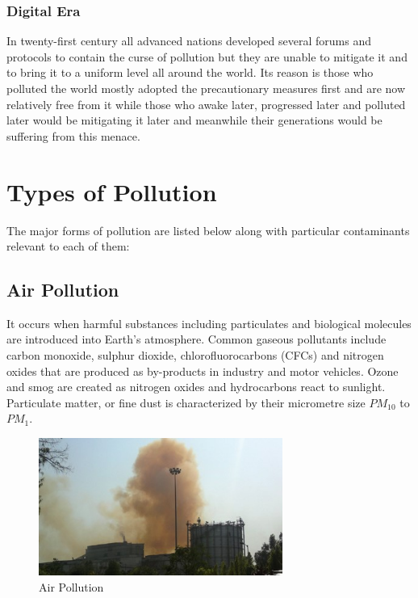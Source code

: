 \subsubsection{Digital Era}
In twenty-first century all advanced nations developed several forums and protocols to contain the curse of pollution but they are unable to mitigate it and to bring it to a uniform level all around the world. Its reason is those who polluted the world mostly adopted the precautionary measures first and are now relatively free from it while those who awake later, progressed later and polluted later would be mitigating it later and meanwhile their generations would be suffering from this menace.\cite{29}


\section{Types of Pollution}
The major forms of pollution are listed below along with particular contaminants relevant to each of them:

\subsection{Air Pollution}
It occurs when harmful substances including particulates and biological molecules are introduced into Earth's atmosphere. Common gaseous pollutants include carbon monoxide, sulphur dioxide, chlorofluorocarbons (CFCs) and nitrogen oxides that are produced as by-products in industry and motor vehicles. Ozone and smog are created as nitrogen oxides and hydrocarbons react to sunlight. Particulate matter, or fine dust is characterized by their micrometre size $PM_{10}$ to $PM_1$.
\begin{figure}[h]
\begin{center}
 \includegraphics[width=80mm]{air.jpg}
 \caption{Air Pollution \cite{2}}
   \label{fig:Air Pollution}
\end{center}
\end{figure}

